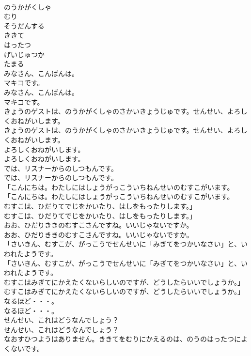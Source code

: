 \documentclass[8pt]{extreport}
\begin{document}
\begin{CJK}{UTF8}{min}
\\	のうかがくしゃ
\\	むり
\\	そうだんする
\\	ききて
\\	はったつ
\\	げいじゅつか
\\	たまる
\\	みなさん、こんばんは。
\\	マキコです。
\\	みなさん、こんばんは。
\\	マキコです。
\\	きょうのゲストは、のうかがくしゃのさかいきょうじゅです。せんせい、よろしくおねがいします。
\\	きょうのゲストは、のうかがくしゃのさかいきょうじゅです。せんせい、よろしくおねがいします。
\\	よろしくおねがいします。
\\	よろしくおねがいします。
\\	では、リスナーからのしつもんです。
\\	では、リスナーからのしつもんです。
\\	「こんにちは。わたしにはしょうがっこういちねんせいのむすこがいます。
\\	「こんにちは。わたしにはしょうがっこういちねんせいのむすこがいます。
\\	むすこは、ひだりてでじをかいたり、はしをもったりします。」
\\	むすこは、ひだりてでじをかいたり、はしをもったりします。」
\\	おお、ひだりききのむすこさんですね。いいじゃないですか。
\\	おお、ひだりききのむすこさんですね。いいじゃないですか。
\\	「さいきん、むすこが、がっこうでせんせいに「みぎてをつかいなさい」と、いわれたようです。
\\	「さいきん、むすこが、がっこうでせんせいに「みぎてをつかいなさい」と、いわれたようです。
\\	むすこはみぎてにかえたくないらしいのですが、どうしたらいいでしょうか。」
\\	むすこはみぎてにかえたくないらしいのですが、どうしたらいいでしょうか。」
\\	なるほど・・・。
\\	なるほど・・・。
\\	せんせい、これはどうなんでしょう？
\\	せんせい、これはどうなんでしょう？
\\	なおすひつようはありません。ききてをむりにかえるのは、のうのはったつによくないです。

\end{CJK}
\end{document}
